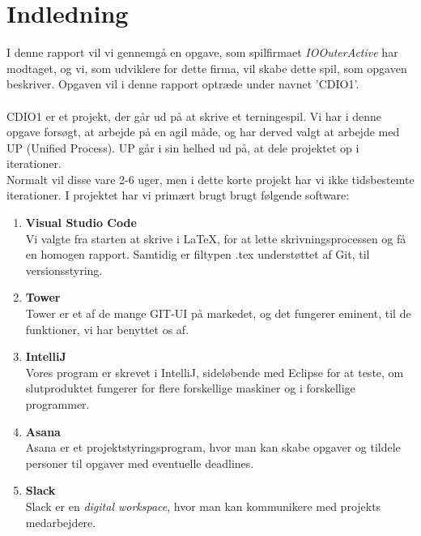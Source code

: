 \chapter{Indledning}
I denne rapport vil vi gennemgå en opgave, som spilfirmaet \textit{IOOuterActive} har modtaget, og vi, som udviklere for dette firma, vil skabe dette spil, som opgaven beskriver.
Opgaven vil i denne rapport optræde under navnet 'CDIO1'.
\\\\CDIO1 er et projekt, der går ud på at skrive et terningespil.
Vi har i denne opgave forsøgt, at arbejde på en agil måde, og har derved valgt at arbejde med UP (Unified Process). 
UP går i sin helhed ud på, at dele projektet op i iterationer. 
\\ Normalt vil disse vare 2-6 uger, men i dette korte projekt har vi ikke tidsbestemte iterationer.
I projektet har vi primært brugt brugt følgende software:
\begin{enumerate}
    \item \textbf{Visual Studio Code}
    \\ Vi valgte fra starten at skrive i LaTeX, for at lette skrivningsprocessen og få en homogen rapport.
    Samtidig er filtypen .tex understøttet af Git, til versionsstyring.
    \item \textbf{Tower}
    \\Tower er et af de mange GIT-UI på markedet, og det fungerer eminent, til de funktioner, vi har benyttet os af.
    \item \textbf{IntelliJ}
    \\Vores program er skrevet i IntelliJ, sideløbende med Eclipse for at teste, om slutproduktet fungerer for flere forskellige maskiner og i forskellige programmer.
    \item \textbf{Asana}
    \\Asana er et projektstyringsprogram, hvor man kan skabe opgaver og tildele personer til opgaver med eventuelle deadlines.
    \item \textbf{Slack}
    \\Slack er en \textit{digital workspace}, hvor man kan kommunikere med projekts medarbejdere.
\end{enumerate}
